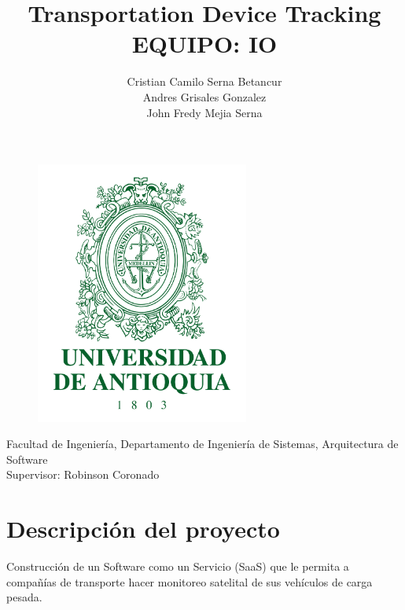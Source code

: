 \documentclass{article}
\title{\huge{\textbf{Transportation Device Tracking}} \\
\LARGE{EQUIPO: IO}}
\author{Cristian Camilo Serna Betancur \\ Andres Grisales Gonzalez \\ John Fredy Mejia Serna}
\begin{document}
\clearpage

\maketitle

\thispagestyle{empty}

\begin{center}
\begin{figure}[h]
    \centering
    \includegraphics[width=7cm]{pics/udea.png}%
    \label{fig:logo}\end{figure}
    \large{Facultad de Ingeniería, Departamento de Ingeniería de Sistemas,
     Arquitectura de Software \\ Supervisor: Robinson Coronado}
\end{center}

\newpage

\setcounter{page}{1}
\tableofcontents


\section{Descripción del proyecto}
Construcción de un Software como un Servicio (SaaS) que le permita a compañías de transporte hacer monitoreo satelital de sus vehículos de carga pesada.
\end{document}
